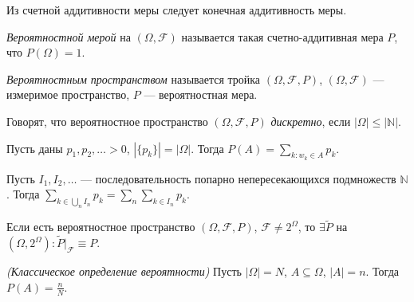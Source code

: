         \begin{col}\label{lect01:col1}
            Из счетной аддитивности меры следует конечная аддитивность меры.
        \end{col}
        \begin{definition}\label{lect01:def9}
            \emph{Вероятностной мерой} на $(\Omega, \mathcal{F})$ называется такая счетно-аддитивная мера $P$, что $P(\Omega) = 1$.
        \end{definition}
        \begin{definition}\label{lect01:def10}
            \emph{Вероятностным пространством} называется тройка $(\Omega, \mathcal{F}, P)$, $(\Omega, \mathcal{F})$ --- измеримое пространство, $P$ --- вероятностная мера.
        \end{definition}
        \begin{definition}\label{lect01:def11}
            Говорят, что вероятностное пространство $(\Omega, \mathcal{F}, P)$ \emph{дискретно}, если $|\Omega| \leq |\mathbb{N}|$. 
        \end{definition}
        Пусть даны $p_1, p_2, \ldots > 0$, $| \{ p_k \} | = |\Omega|$. Тогда $P(A) = \sum\limits_{k : w_k \in A}p_k$.
        \begin{lemma}\label{lect01:lemma1}
            Пусть $I_1, I_2, \dots$ --- последовательность попарно непересекающихся подмножеств $\mathbb{N}$. Тогда $\sum\limits_{k \in \bigcup\limits_n I_n}p_k = \sum\limits_n \sum\limits_{k \in I_n}p_k$.
        \end{lemma}
        \begin{theorem}\label{lect01:th3}
            Если есть вероятностное пространство $(\Omega, \mathcal{F}, P)$, $\mathcal{F} \neq 2^{\Omega}$, то $\exists \widetilde{P}$ на $(\Omega, 2^{\Omega}) : \widetilde{P}|_{\mathcal{F}} \equiv P$. 
        \end{theorem}
        \begin{definition}\label{lect01:def12}
            \emph{(Классическое определение вероятности)} Пусть $|\Omega| = N$, $A \subseteq \Omega$, $|A| = n$. Тогда $P(A) = \frac{n}{N}$. 
        \end{definition}